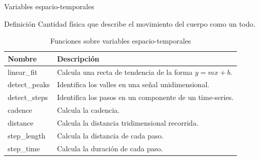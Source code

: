 \documentclass[aspectratio=169,spanish]{beamer} %
\newcommand{\mono}[1]{{\ttfamily #1}}
\begin{document}
\begin{frame}{Variables espacio-temporales}
    \begin{block}{Definición}
        Cantidad física que describe el movimiento del cuerpo como un todo. 
    \end{block}
\begin{table}
    \centering
    \caption{Funciones sobre variables espacio-temporales}
    \label{tab:space-tmp}
    \scriptsize
    \begin{tabular}{ll}
        \toprule
        Nombre & Descripción \\
        \midrule
        \mono{linear\_fit} & Calcula una recta de tendencia de la forma $y = mx + b$. \\
        \mono{detect\_peaks} & Identifica los valles en una señal unidimensional. \\
        \mono{detect\_steps} & Identifica los pasos en un componente de un time-series. \\
        \mono{cadence} & Calcula la cadencia. \\
        \mono{distance} & Calcula la distancia tridimensional recorrida. \\
        \mono{step\_length} & Calcula la distancia de cada paso. \\
        \mono{step\_time} & Calcula la duración de cada paso. \\
        \bottomrule
    \end{tabular}
\end{table}
\end{frame}
\end{document}
